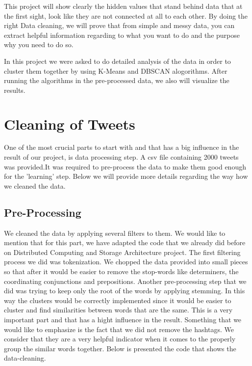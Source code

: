 \documentclass{article}
\begin{document}
        This project will show clearly the hidden values that stand behind data that at the first sight, look like they are not connected at all to each other. By doing the right Data cleaning, we will prove that from simple and messy data, you can extract helpful information regarding to what you want to do and the purpose why you need to do so. 
        
        In this project we were asked to do detailed analysis of the data in order to cluster them together by using K-Means and DBSCAN alogorithms. After running the algorithms in the pre-processed data, we also will visualize the results.
         
        \newpage         
        \section{ Cleaning of Tweets }
One of the most crucial parts to start with and that has a big influence in the result of our project, is data processing step. A csv file containing 2000 tweets was provided.It was required to pre-process the data to make them good enough for the 'learning' step. Below we will provide more details regarding the way how we cleaned the data. 
        
        \subsection{Pre-Processing}

        We cleaned the data by applying several filters to them. We would like to mention that for this part, we have adapted the code that we already did before on Distributed Computing and Storage Architecture project. 
        The first filtering process we did was tokenization. We chopped the data provided into small pieces so that after it would be easier to remove the stop-words like determiners, the coordinating conjunctions and prepositions.
         Another pre-processing step that we did was trying to keep only the root of the words by applying stemming. In this way the clusters would be correctly implemented since it would be easier to cluster and find similarities between words that are the same. This is a very important part and that has a hight influence in the result. 
         Something that we would like to emphasize is the fact that we did not remove the hashtags. We consider that they are a very helpful indicator when it comes to the properly group the similar words together. Below is presented the code that shows the data-cleaning. 
         
\end{document}
